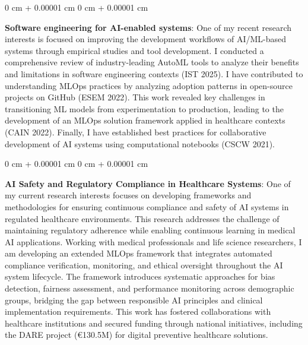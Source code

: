 \documentclass[10pt, a4paper]{article}
\newenvironment{onecolentry}{
    \begin{adjustwidth}{
        0 cm + 0.00001 cm
    }{
        0 cm + 0.00001 cm
    }
}{
    \end{adjustwidth}
} %
\begin{document}
        \vspace{0.2 cm}

        \begin{onecolentry}
            \textbf{Software engineering for AI-enabled systems}: One of my recent research interests is focused on improving the development workflows of AI/ML-based systems through empirical studies and tool development. I conducted a comprehensive review of industry-leading AutoML tools to analyze their benefits and limitations in software engineering contexts (IST 2025). I have contributed to understanding MLOps practices by analyzing adoption patterns in open-source projects on GitHub (ESEM 2022). This work revealed key challenges in transitioning ML models from experimentation to production, leading to the development of an MLOps solution framework applied in healthcare contexts (CAIN 2022). Finally, I have established best practices for collaborative development of AI systems using computational notebooks (CSCW 2021).
        \end{onecolentry}

        \vspace{0.2 cm}

        \begin{onecolentry}
            \textbf{AI Safety and Regulatory Compliance in Healthcare Systems}: One of my current research interests focuses on developing frameworks and methodologies for ensuring continuous compliance and safety of AI systems in regulated healthcare environments. This research addresses the challenge of maintaining regulatory adherence while enabling continuous learning in medical AI applications. Working with medical professionals and life science researchers, I am developing an extended MLOps framework that integrates automated compliance verification, monitoring, and ethical oversight throughout the AI system lifecycle. The framework introduces systematic approaches for bias detection, fairness assessment, and performance monitoring across demographic groups, bridging the gap between responsible AI principles and clinical implementation requirements. This work has fostered collaborations with healthcare institutions and secured funding through national initiatives, including the DARE project (€130.5M) for digital preventive healthcare solutions.
        \end{onecolentry}

        \vspace{0.2 cm}
\end{document}
